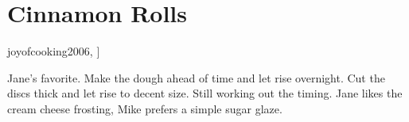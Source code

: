 \section{Cinnamon Rolls}


\begin{recipestats}[
	servings=16,
	preptime=1,
	bakingtime=cook time,
	inactivetime=12 \hour,
	source=Jane \& Mike,
	original=\citetitle{joyofcooking2006}~\cite[p.~621]{joyofcooking2006},
]
\end{recipestats}


\begin{recipeabstract}
	Jane's favorite.
	Make the dough ahead of time and let rise overnight.
	Cut the discs thick and let rise to decent size.
	Still working out the timing.
	Jane likes the cream cheese frosting, Mike prefers a simple sugar glaze.
\end{recipeabstract}


\pagebreak[4]  %
\begin{ingredientcolumns}
	\begin{ingredientblock}[dough]
		\\
		\\
		\\
		\\
		\\
		\\
		\\
		\\
		\\
	\end{ingredientblock}

	\columnbreak
	\begin{ingredientblock}[filling]
		\\
		\\
	\end{ingredientblock}

	\medskip
	\begin{ingredientblock}[frosting]
		\\
		\\
		\\
	\end{ingredientblock}
\end{ingredientcolumns}


